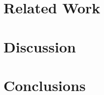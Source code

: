 \documentclass[sigconf]{acmart}
\begin{document}
\section{Related Work}


\section{Discussion}


\section{Conclusions}


\begin{acks}

\end{acks}


\balance

\end{document}
